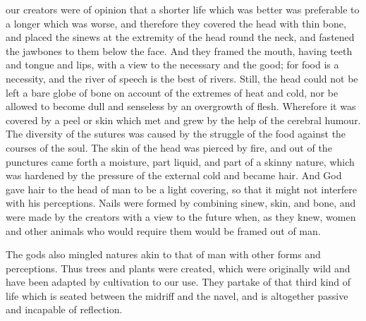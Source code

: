 our creators were of opinion that a shorter life which was better was
preferable to a longer which was worse, and therefore they covered the
head with thin bone, and placed the sinews at the extremity of the head
round the neck, and fastened the jawbones to them below the face. And they
framed the mouth, having teeth and tongue and lips, with a view to the
necessary and the good; for food is a necessity, and the river of speech
is the best of rivers. Still, the head could not be left a bare globe of
bone on account of the extremes of heat and cold, nor be allowed to become
dull and senseless by an overgrowth of flesh. Wherefore it was covered by
a peel or skin which met and grew by the help of the cerebral humour. The
diversity of the sutures was caused by the struggle of the food against
the courses of the soul. The skin of the head was pierced by fire, and out
of the punctures came forth a moisture, part liquid, and part of a skinny
nature, which was hardened by the pressure of the external cold and became
hair. And God gave hair to the head of man to be a light covering, so that
it might not interfere with his perceptions. Nails were formed by
combining sinew, skin, and bone, and were made by the creators with a view
to the future when, as they knew, women and other animals who would
require them would be framed out of man.

The gods also mingled natures akin to that of man with other forms and
perceptions. Thus trees and plants were created, which were originally
wild and have been adapted by cultivation to our use. They partake of that
third kind of life which is seated between the midriff and the navel, and
is altogether passive and incapable of reflection.

